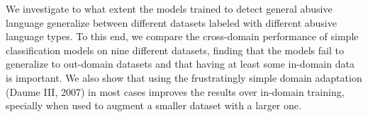 We investigate to what extent the models trained to detect general abusive language generalize between different datasets labeled with different abusive language types. To this end, we compare the cross-domain performance of simple classification models on nine different datasets, finding that the models fail to generalize to out-domain datasets and that having at least some in-domain data is important. We also show that using the frustratingly simple domain adaptation (Daume III, 2007) in most cases improves the results over in-domain training,  specially when used to augment a smaller dataset with a larger one.
